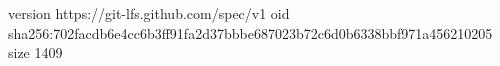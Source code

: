 version https://git-lfs.github.com/spec/v1
oid sha256:702facdb6e4cc6b3ff91fa2d37bbbe687023b72c6d0b6338bbf971a456210205
size 1409
